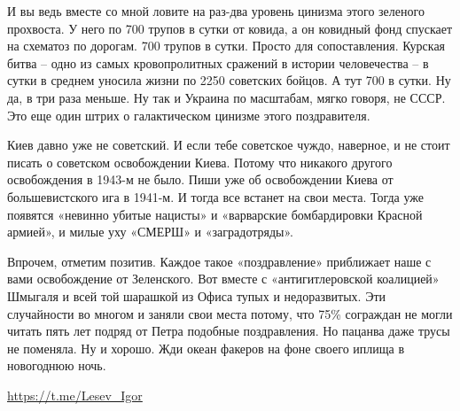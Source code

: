 И вы ведь вместе со мной ловите на раз-два уровень цинизма этого зеленого
прохвоста. У него по 700 трупов в сутки от ковида, а он ковидный фонд спускает
на схематоз по дорогам. 700 трупов в сутки. Просто для сопоставления. Курская
битва – одно из самых кровопролитных сражений в истории человечества – в сутки
в среднем уносила жизни по 2250 советских бойцов. А тут 700 в сутки. Ну да, в
три раза меньше. Ну так и Украина по масштабам, мягко говоря, не СССР. Это еще
один штрих о галактическом цинизме этого поздравителя.

Киев давно уже не советский. И если тебе советское чуждо, наверное, и не стоит
писать о советском освобождении Киева. Потому что никакого другого освобождения
в 1943-м не было. Пиши уже об освобождении Киева от большевистского ига в
1941-м. И тогда все встанет на свои места. Тогда уже появятся «невинно убитые
нацисты» и «варварские бомбардировки Красной армией», и милые уху «СМЕРШ» и
«заградотряды».

Впрочем, отметим позитив. Каждое такое «поздравление» приближает наше с вами
освобождение от Зеленского. Вот вместе с «антигитлеровской коалицией» Шмыгаля и
всей той шарашкой из Офиса тупых и недоразвитых. Эти случайности во многом и
заняли свои места потому, что 75\% сограждан не могли читать пять лет подряд от
Петра подобные поздравления. Но пацанва даже трусы не поменяла. Ну и хорошо.
Жди океан факеров на фоне своего иплища в новогоднюю ночь.

\url{https://t.me/Lesev_Igor}

